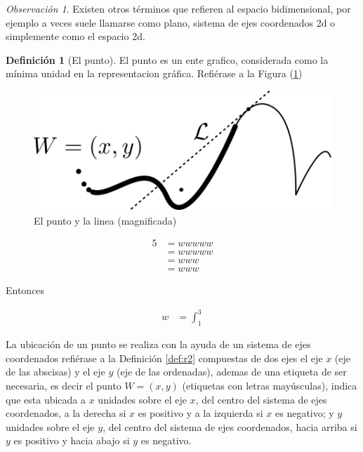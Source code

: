 \documentclass[
  16pt,
]{krantz}
\theoremstyle{definition}
\newtheorem{definition}{Definición}[chapter]
\theoremstyle{definition}
\theoremstyle{definition}
\theoremstyle{definition}
\theoremstyle{remark}
\newtheorem*{remark}{Observación}
\begin{document}
\begin{remark}
{}Existen otros términos que refieren al espacio bidimensional, por ejemplo a veces suele llamarse como plano, sistema de ejes coordenados 2d o simplemente como el espacio 2d.
\end{remark}

\begin{definition}[El punto]
\protect\hypertarget{def:punto}{}{\label{def:punto} {} }El punto es un ente grafico, considerada como la mínima unidad en la representacion gráfica. Refiérase a la Figura (\ref{fig:puntolinea})
\end{definition}

\begin{figure}[!ht]

{\centering \includegraphics{puntolinea} 

}

\caption{El punto y la linea (magnificada)}\label{fig:puntolinea}
\end{figure}

\[
\begin{split}
5&=wwwww\\
&=wwwww\\
&=www\\
&=www
\end{split}
\]

Entonces

\[
\begin{aligned}
w&=\int_1^3
\end{aligned}
\label{eq:wwwwwww}
\]

La ubicación de un punto se realiza con la ayuda de un sistema de ejes coordenados refiérase a la Definición \ref{def:r2} compuestas de dos ejes el eje \(x\) (eje de las abscisas) y el eje \(y\) (eje de las ordenadas), ademas de una etiqueta de ser necesaria, es decir el punto \(W=(x,y)\) (etiquetas con letras mayúsculas), indica que esta ubicada a \(x\) unidades sobre el eje \(x\), del centro del sistema de ejes coordenados, a la derecha si \(x\) es positivo y a la izquierda si \(x\) es negativo; y \(y\) unidades sobre el eje \(y\), del centro del sistema de ejes coordenados, hacia arriba si \(y\) es positivo y hacia abajo si \(y\) es negativo.
\end{document}
